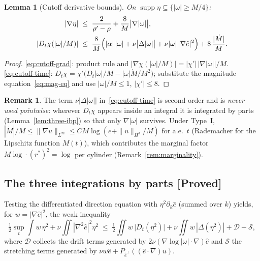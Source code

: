 \documentclass[11pt]{article}
\newtheorem{lemma}[theorem]{Lemma}
\theoremstyle{definition}
\newtheorem{remark}[theorem]{Remark}
\theoremstyle{remark}
\begin{document}
\begin{lemma}[Cutoff derivative bounds]\label{lem:cutoff-derivs}
  On $\operatorname{supp}\eta\subseteq\{|\omega|\geq M/4\}$:
  \begin{align}
    |\nabla\eta| &\;\leq\; \frac{2}{\rho'-\rho}
      + \frac{8}{M}\bigl|\nabla|\omega|\bigr|, \label{eq:cutoff-grad}\\
    |D_t\chi(|\omega|/M)| &\;\leq\;
      \frac{8}{M}\Bigl(|\alpha|\,|\omega| + \nu\bigl|\Delta|\omega|\bigr|
      + \nu|\omega|\,|\nabla\hat{e}|^2\Bigr)
      + 8\,\frac{|\dot M|}{M}. \label{eq:cutoff-time}
  \end{align}
\end{lemma}
\begin{proof}
  \eqref{eq:cutoff-grad}: product rule and
  $|\nabla\chi(|\omega|/M)| = |\chi'|\,|\nabla|\omega||/M$.
  \eqref{eq:cutoff-time}: $D_t\chi = \chi'\bigl(D_t|\omega|/M
  - |\omega|\dot M/M^2\bigr)$; substitute the magnitude
  equation~\eqref{eq:mag-eq} and use $|\omega|/M\leq 1$, $|\chi'|\leq 8$.
\end{proof}

\begin{remark}
  The term $\nu|\Delta|\omega||$ in~\eqref{eq:cutoff-time} is second-order
  and is \emph{never used pointwise}: wherever $D_t\chi$ appears inside an
  integral it is integrated by parts (Lemma~\ref{lem:three-ibp}) so that
  only $\nabla|\omega|$ survives. Under Type~I,
  $|\dot M|/M \leq \|\nabla u\|_{L^\infty} \leq C M \log(e+\|u\|_{H^3}/M)$
  for a.e.\ $t$ (Rademacher for the Lipschitz function $M(t)$), which
  contributes the marginal factor
  $M\log\cdot(r^*)^2 = \log$ per cylinder (Remark~\ref{rem:marginality}).
\end{remark}

\subsection{The three integrations by parts [Proved]}

Testing the differentiated direction equation with $\eta^2\partial_k\hat{e}$
(summed over $k$) yields, for $w=|\nabla\hat{e}|^2$, the weak inequality
\begin{equation}\label{eq:weak-w}
  \tfrac12\sup_{t}\!\int w\,\eta^2
  + \nu\!\iint |\nabla^2\hat{e}|^2\eta^2
  \;\leq\;
  \tfrac12\iint w\,\bigl|D_t(\eta^2)\bigr|
  + \nu\iint w\,|\Delta(\eta^2)|
  + \mathcal{D} + \mathcal{S},
\end{equation}
where $\mathcal{D}$ collects the drift terms generated by
$2\nu(\nabla\log|\omega|\cdot\nabla)\hat{e}$ and $\mathcal{S}$ the
stretching terms generated by $\nu w\hat{e} + P_{\hat{e}^\perp}((\hat{e}\cdot\nabla)u)$.
\end{document}

